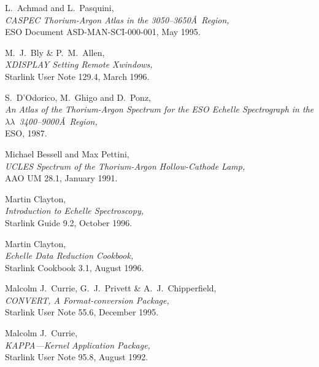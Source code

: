 \documentclass[twoside,11pt]{article}
\newcommand{\stardocinitials}  {SC}
\newcommand{\stardocnumber}    {7.2}
\newcommand{\stardocname}{\stardocinitials /\stardocnumber}
\newcommand{\htmlref}[2]{#1}
\newcommand{\xref}[3]{#1}
\newcommand{\xlabel}[1]{}
\newcommand{\mlabel}[1]{\xlabel{#1}\label{#1}}
\newcommand{\scspec}[2]{#1}
\newcommand{\scspec}[2]{#2}
\begin{document}
\newpage
\markboth{References}{\stardocname}
\mlabel{references}
\begin{thebibliography}{999}

 L.~Achmad and L.~Pasquini,\\
      {\sl CASPEC Thorium-Argon Atlas in the
      3050\scspec{--}{-}3650\AA\ Region,}\\
      ESO Document ASD-MAN-SCI-000-001, May 1995.

 M.~J.~Bly \& P.~M.~Allen,\\
      {\sl \xref{XDISPLAY Setting Remote Xwindows}{sun129}{},}\\
      Starlink User Note 129.4, March 1996.

 S.~D'Odorico, M.~Ghigo and D.~Ponz,\\
      {\sl An Atlas of the Thorium-Argon Spectrum for the ESO Echelle
      Spectrograph in the $\lambda\lambda$~3400\scspec{--}{-}9000\AA\ Region,}\\
      ESO, 1987.

 Michael Bessell and Max Pettini,\\
      {\sl UCLES Spectrum of the Thorium-Argon Hollow-Cathode Lamp,}\\
      \htmlref{AAO}{gl_aao_aat} UM 28.1, January 1991.

 Martin Clayton,\\
      {\sl \xref{Introduction to Echelle Spectroscopy}{sg9}{},}\\
      Starlink Guide 9.2, October 1996.

 Martin Clayton,\\
      {\sl \xref{Echelle Data Reduction Cookbook}{sc3}{},}\\
      Starlink Cookbook 3.1, August 1996.

 Malcolm J.~Currie, G.~J.~Privett \& A.~J.~Chipperfield,\\
      {\sl \xref{CONVERT, A Format-conversion Package}{sun55}{},}\\
      Starlink User Note 55.6, December 1995.

 Malcolm J.~Currie,\\
      {\sl \xref{KAPPA\scspec{---}{ - }Kernel Application Package}{sun95}{},}\\
      Starlink User Note 95.8, August 1992.


\end{thebibliography}
\end{document}
